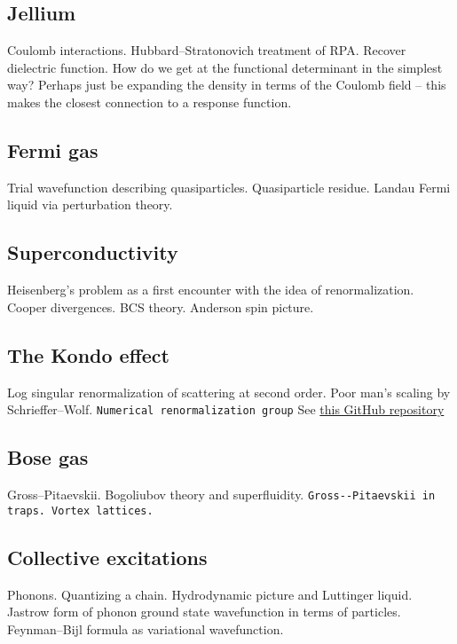 \subsection{Jellium}

Coulomb interactions. Hubbard--Stratonovich treatment of RPA. Recover dielectric function. How do we get at the functional determinant in the simplest way? Perhaps just be expanding the density in terms of the Coulomb field -- this makes the closest connection to a response function.

\subsection{Fermi gas}

Trial wavefunction describing quasiparticles. Quasiparticle residue. Landau Fermi liquid via perturbation theory. 

\subsection{Superconductivity}

Heisenberg's problem as a first encounter with the idea of renormalization. Cooper divergences. BCS theory. Anderson spin picture.

\subsection{The Kondo effect}

Log singular renormalization of scattering at second order. Poor man's scaling by Schrieffer--Wolf. \verb|Numerical renormalization group| See \href{https://github.com/LucasNogueiraMartins/NRG-Didactic}{this GitHub repository}

\subsection{Bose gas}

Gross--Pitaevskii. Bogoliubov theory and superfluidity. \verb|Gross--Pitaevskii in traps. Vortex lattices.|

\subsection{Collective excitations}

Phonons. Quantizing a chain. Hydrodynamic picture and Luttinger liquid. Jastrow form of phonon ground state wavefunction in terms of particles. Feynman–Bijl formula as variational wavefunction. 

